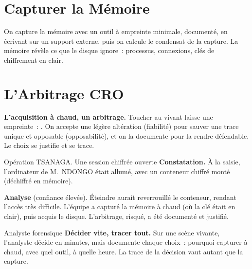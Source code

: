 \section{Capturer la Mémoire}
\label{sec:c09-memoire}

On capture la mémoire avec un outil à empreinte minimale, documenté, en
écrivant sur un support externe, puis on calcule le condensat de la capture.
La mémoire révèle ce que le disque ignore~: processus, connexions, clés de
chiffrement en clair.

\section{L'Arbitrage CRO}
\label{sec:c09-cro}

\begin{boxCRO}
\textbf{L'acquisition à chaud, un arbitrage.} Toucher au vivant laisse une
empreinte~: . On accepte une légère altération (fiabilité) pour
sauver une trace unique et opposable (opposabilité), et on la documente pour
la rendre défendable. Le choix se justifie et se trace.
\end{boxCRO}

\begin{boxscenario}{Opération TSANAGA. Une session chiffrée ouverte}
\textbf{Constatation.} À la saisie, l'ordinateur de M.~NDONGO était allumé,
avec un conteneur chiffré monté (déchiffré en mémoire).

\medskip
\textbf{Analyse} (confiance élevée). Éteindre aurait reverrouillé le
conteneur, rendant l'accès très difficile. L'équipe a capturé la mémoire à
chaud (où la clé était en clair), puis acquis le disque. L'arbitrage, risqué,
a été documenté et justifié.
\end{boxscenario}

\begin{boxmetier}{Analyste forensique}
\textbf{Décider vite, tracer tout.} Sur une scène vivante, l'analyste décide
en minutes, mais documente chaque choix~: pourquoi capturer à chaud, avec
quel outil, à quelle heure. La trace de la décision vaut autant que la
capture.
\end{boxmetier}

\separateur

